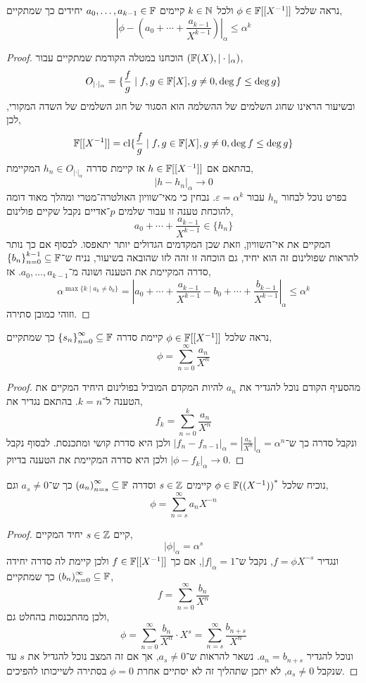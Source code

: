 \subquestion{}
נראה שלכל $\phi \in \mathbb{F}[[X^{-1}]]$ ולכל $k \in \mathbb{N}$ קיימים $a_0, \ldots, a_{k - 1} \in \mathbb{F}$ יחידים כך שמתקיים,
\[
	| \phi - (a_0 + \cdots + \frac{a_{k - 1}}{X^{k - 1}}) |_{\alpha}
	\le \alpha^k
\]
\begin{proof}
	הוכחנו במטלה הקודמת שמתקיים עבור $(\mathbb{F}(X), | \cdot |_{\alpha})$,
	\[
		O_{| \cdot |_{\alpha}}
		= \{ \frac{f}{g} \mid f, g \in \mathbb{F}[X], g \ne 0, \deg f \le \deg g \}
	\]
	ובשיעור הראינו שחוג השלמים של ההשלמה הוא הסגור של חוג השלמים של השדה המקורי, לכן,
	\[
		\mathbb{F}[[X^{-1}]]
		= \operatorname{cl} \{ \frac{f}{g} \mid f, g \in \mathbb{F}[X], g \ne 0, \deg f \le \deg g \}
	\]
	בהתאם אם $h \in \mathbb{F}[[X^{-1}]]$ אז קיימת סדרה $h_n \in O_{| \cdot |_{\alpha}}$ המקיימת,
	\[
		| h - h_n |_{\alpha}
		\to 0
	\]
	בפרט נוכל לבחור  $h_n$ עבור $\varepsilon = \alpha^k$.
	נבחין כי מאי־שוויון האולטרה־מטרי ומהלך מאוד דומה להוכחת טענה זו עבור שלמים $p$־אדיים נקבל שקיים פולינום,
	\[
		a_0 + \cdots + \frac{a_{k - 1}}{X^{k - 1}}
		\in \{ h_n \}
	\]
	המקיים את אי־השוויון, וזאת שכן המקדמים הגדולים יותר יתאפסו.
	לבסוף אם כך נותר להראות שפולינום זה הוא יחיד, גם הוכחה זו זהה לזו שהובאה בשיעור,
	נניח ש־${\{ b_n \}}_{n = 0}^{k - 1} \subseteq \mathbb{F}$ סדרה המקיימת את הטענה ושונה מ־$a_0, \ldots, a_{k - 1}$.
	אז,
	\[
		\alpha^{\max\{ k \mid a_k \ne b_k \}}
		= |a_0 + \cdots + \frac{a_{k - 1}}{X^{k - 1}} - b_0 + \cdots + \frac{b_{k - 1}}{X^{k - 1}}|_{\alpha}
		\le \alpha^k
	\]
	וזוהי כמובן סתירה.
\end{proof}

\subquestion{}
נראה שלכל $\phi \in \mathbb{F}[[X^{-1}]]$ קיימת סדרה ${\{ s_n \}}_{n = 0}^\infty \subseteq \mathbb{F}$ כך שמתקיים,
\[
	\phi
	= \sum_{n = 0}^\infty \frac{a_n}{X^n}
\]
\begin{proof}
	מהסעיף הקודם נוכל להגדיר את $a_n$ להיות המקדם המוביל בפולינום היחיד המקיים את הטענה ל־$k = n$.
	בהתאם נגדיר את,
	\[
		f_k
		= \sum_{n = 0}^k \frac{a_n}{X^n}
	\]
	ונקבל סדרה כך ש־$|f_n - f_{n - 1}|_{\alpha} = |\frac{a_n}{X^n}|_{\alpha} = \alpha^n$ ולכן היא סדרת קושי ומתכנסת.
	לבסוף נקבל $|\phi - f_k|_{\alpha} \to 0$ ולכן היא סדרה המקיימת את הטענה בדיוק.
\end{proof}

\subquestion{}
נוכיח שלכל $\phi \in {\mathbb{F}((X^{-1}))}^*$ קיימים $s \in \mathbb{Z}$ וסדרה ${(a_n)}_{n = s}^{\infty} \subseteq \mathbb{F}$ כך ש־$a_s \ne 0$ וגם,
\[
	\phi = \sum_{n = s}^\infty a_n X^{-n}
\]
\begin{proof}
	קיים $s \in \mathbb{Z}$ יחיד המקיים,
	\[
		| \phi |_{\alpha}
		= \alpha^s
	\]
	ונגדיר $f = \phi X^{-s}$, נקבל ש־$|f|_{\alpha} = 1$, אם כך $f \in \mathbb{F}[[X^{-1}]]$ ולכן קיימת לה סדרה יחידה ${(b_n)}_{n = 0}^{\infty} \subseteq \mathbb{F}$ כך שמתקיים,
	\[
		f
		= \sum_{n = 0}^\infty \frac{b_n}{X^n}
	\]
	ולכן מהתכנסות בהחלט גם,
	\[
		\phi
		= \sum_{n = 0}^\infty \frac{b_n}{X^n} \cdot X^s
		= \sum_{n = s}^\infty \frac{b_{n + s}}{X^n}
	\]
	ונוכל להגדיר $a_n = b_{n + s}$.
	נשאר להראות ש־$a_s \ne 0$, אך אם זה המצב נוכל להגדיל את $s$ עד שנקבל $a_s \ne 0$, לא יתכן שתהליך זה לא יסתיים אחרת $\phi = 0$ בסתירה לשייכותו להפיכים.
\end{proof}

